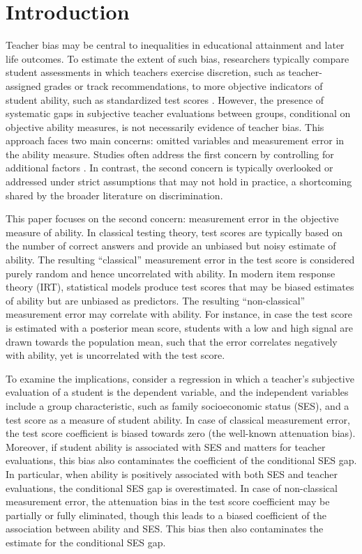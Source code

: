 \section{Introduction}

Teacher bias may be central to inequalities in educational attainment and later life outcomes. To estimate the extent of such bias, researchers typically compare student assessments in which teachers exercise discretion, such as teacher-assigned grades or track recommendations, to more objective indicators of student ability, such as standardized test scores \citep{alesina2024revealing,falk2023mentoring}. However, the presence of systematic gaps in subjective teacher evaluations between groups, conditional on objective ability measures, is not necessarily evidence of teacher bias. This approach faces two main concerns: omitted variables and measurement error in the ability measure. Studies often address the first concern by controlling for additional factors \citep{burgess2013test}. In contrast, the second concern is typically overlooked or addressed under strict assumptions that may not hold in practice, a shortcoming shared by the broader literature on discrimination.

This paper focuses on the second concern: measurement error in the objective measure of ability. In classical testing theory, test scores are typically based on the number of correct answers and provide an unbiased but noisy estimate of ability. The resulting ``classical'' measurement error in the test score is considered purely random and hence uncorrelated with ability. In modern item response theory (IRT), statistical models produce test scores that may be biased estimates of ability but are unbiased as predictors. The resulting ``non-classical'' measurement error may correlate with ability. For instance, in case the test score is estimated with a posterior mean score, students with a low and high signal are drawn towards the population mean, such that the error correlates negatively with ability, yet is uncorrelated with the test score. 

To examine the implications, consider a regression in which a teacher’s subjective evaluation of a student is the dependent variable, and the independent variables include a group characteristic, such as family socioeconomic status (SES), and a test score as a measure of student ability. In case of classical measurement error, the test score coefficient is biased towards zero (the well-known attenuation bias). Moreover, if student ability is associated with SES and matters for teacher evaluations, this bias also contaminates the coefficient of the conditional SES gap. In particular, when ability is positively associated with both SES and teacher evaluations, the conditional SES gap is overestimated. In case of non-classical measurement error, the attenuation bias in the test score coefficient may be partially or fully eliminated, though this leads to a biased coefficient of the association between ability and SES. This bias then also contaminates the estimate for the conditional SES gap.


